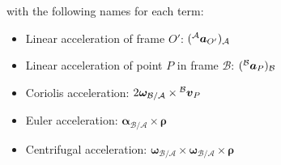 \documentclass[twocolumn]{article}    %
\begin{document}
with the following names for each term:
\begin{itemize}
    \item Linear acceleration of frame \(O'\):  \((\prescript{\mathcal{A}}{}{\bm{a}_{O'}})_\mathcal{A}\) 
    \item Linear acceleration of point \(P\) in frame \(\mathcal{B}\): \((\prescript{\mathcal{B}}{}{\bm{a}}_P)_\mathcal{B}\)
    \item Coriolis acceleration: \(2\bm{\omega}_{\mathcal{B}/\mathcal{A}} \times \prescript{\mathcal{B}}{}{\bm{v}}_P \)
    \item Euler acceleration: \(\bm{\alpha}_{\mathcal{B}/\mathcal{A}} \times \bm{\rho} \)
    \item Centrifugal acceleration: \(\bm{\omega}_{\mathcal{B}/\mathcal{A}} \times \bm{\omega}_{\mathcal{B}/\mathcal{A}}\times\bm{\rho}\)
\end{itemize}
\end{document}
